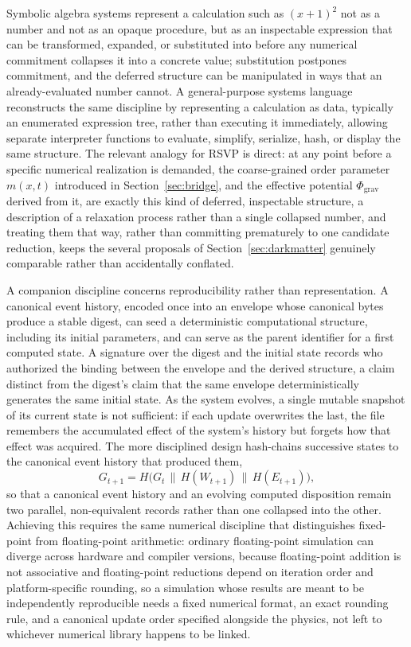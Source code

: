 \documentclass[11pt]{article}
\begin{document}
Symbolic algebra systems represent a calculation such as $(x+1)^2$ not as a number and not as an opaque procedure, but as an inspectable expression that can be transformed, expanded, or substituted into before any numerical commitment collapses it into a concrete value; substitution postpones commitment, and the deferred structure can be manipulated in ways that an already-evaluated number cannot. A general-purpose systems language reconstructs the same discipline by representing a calculation as data, typically an enumerated expression tree, rather than executing it immediately, allowing separate interpreter functions to evaluate, simplify, serialize, hash, or display the same structure. The relevant analogy for RSVP is direct: at any point before a specific numerical realization is demanded, the coarse-grained order parameter $m(x,t)$ introduced in Section~\ref{sec:bridge}, and the effective potential $\Phi_{\mathrm{grav}}$ derived from it, are exactly this kind of deferred, inspectable structure, a description of a relaxation process rather than a single collapsed number, and treating them that way, rather than committing prematurely to one candidate reduction, keeps the several proposals of Section~\ref{sec:darkmatter} genuinely comparable rather than accidentally conflated.

A companion discipline concerns reproducibility rather than representation. A canonical event history, encoded once into an envelope whose canonical bytes produce a stable digest, can seed a deterministic computational structure, including its initial parameters, and can serve as the parent identifier for a first computed state. A signature over the digest and the initial state records who authorized the binding between the envelope and the derived structure, a claim distinct from the digest's claim that the same envelope deterministically generates the same initial state. As the system evolves, a single mutable snapshot of its current state is not sufficient: if each update overwrites the last, the file remembers the accumulated effect of the system's history but forgets how that effect was acquired. The more disciplined design hash-chains successive states to the canonical event history that produced them,
\[
G_{t+1} = H\bigl(G_t \,\|\, H(W_{t+1}) \,\|\, H(E_{t+1})\bigr),
\]
so that a canonical event history and an evolving computed disposition remain two parallel, non-equivalent records rather than one collapsed into the other. Achieving this requires the same numerical discipline that distinguishes fixed-point from floating-point arithmetic: ordinary floating-point simulation can diverge across hardware and compiler versions, because floating-point addition is not associative and floating-point reductions depend on iteration order and platform-specific rounding, so a simulation whose results are meant to be independently reproducible needs a fixed numerical format, an exact rounding rule, and a canonical update order specified alongside the physics, not left to whichever numerical library happens to be linked.
\end{document}
